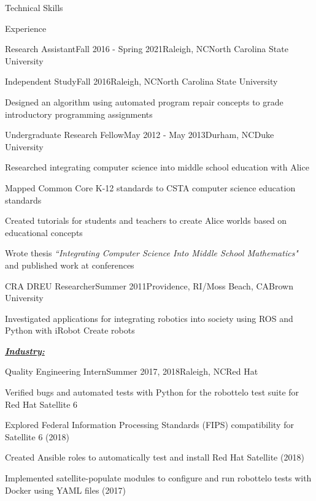 \documentclass{resume} %
\begin{document}
\begin{rSection}{Technical Skills}
\begin{rSection}{Experience}
\begin{pSubsection}{\small Research Assistant}{\small Fall 2016 - Spring 2021}{\small Raleigh, NC}{\small North Carolina State University}
\end{pSubsection}
\vspace{-10pt}

\begin{pSubsection}{\small Independent Study}{\small Fall 2016}{\small Raleigh, NC}{\small North Carolina State University}
\item {\small Designed an algorithm using automated program repair concepts to grade introductory programming assignments}
\end{pSubsection}
\vspace{-10pt}

\begin{pSubsection}{\small Undergraduate Research Fellow}{\small May 2012 - May 2013}{\small Durham, NC}{\small Duke University}
\item {\small Researched integrating computer science into middle school education with Alice}
\item {\small Mapped Common Core K-12 standards to CSTA computer science education standards}
\item {\small Created tutorials for students and teachers to create Alice worlds based on educational concepts}
\item {\small Wrote thesis \textit{``Integrating Computer Science Into Middle School Mathematics"} and published work at conferences}
\end{pSubsection}
\vspace{-10pt}

\begin{pSubsection}{\small CRA DREU Researcher}{\small Summer 2011}{\small Providence, RI/Moss Beach, CA}{\small Brown University}
\item {\small Investigated applications for integrating robotics into society using ROS and Python with iRobot Create robots}
\end{pSubsection}
\vspace{-8pt}

\underline{\textbf{\textit{Industry:}}}
\vspace{-7pt}

\begin{pSubsection}{\small Quality Engineering Intern}{\small Summer 2017, 2018}{\small Raleigh, NC}{\small Red Hat}
 \item {\small Verified bugs and automated tests with Python for the robottelo test suite for Red Hat Satellite 6}
 \item {\small Explored Federal Information Processing Standards (FIPS) compatibility for Satellite 6 (2018)}
 \item {\small Created Ansible roles to automatically test and install Red Hat Satellite (2018)}
 \item {\small Implemented satellite-populate modules to configure and run robottelo tests with Docker using YAML files (2017)}
\end{pSubsection}
\vspace{-10pt}


\end{rSection}
\end{rSection}
\end{document}
